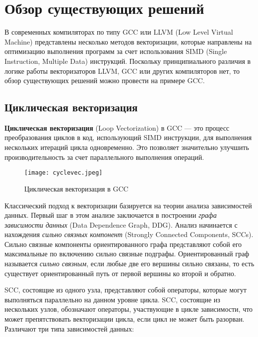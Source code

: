 \section{Обзор существующих решений}
\label{sec:Chapter2} 


В современных компиляторах по типу GCC или LLVM (Low Level Virtual Machine) представлены несколько методов векторизации, которые направлены на оптимизацию выполнения программ за счет использования SIMD (Single Instruction, Multiple Data) инструкций. Поскольку принципиального различия в логике работы векторизаторов LLVM, GCC или других компиляторов нет, то обзор существующих решений можно провести на примере GCC.

\subsection{Циклическая векторизация}

\textbf{Циклическая векторизация} (Loop Vectorization) в GCC — это процесс преобразования циклов в код, использующий SIMD инструкции, для выполнения нескольких итераций цикла одновременно. Это позволяет значительно улучшить производительность за счет параллельного выполнения операций.

\begin{figure}[!htb]
    \centering
    \texttt{[image: cyclevec.jpeg]}
    \caption{Циклическая векторизация в GCC}
\end{figure}

Классический подход к векторизации базируется на теории анализа зависимостей данных. Первый шаг в этом анализе заключается в построении \textit{графа зависимости данных} (Data Dependence Graph, DDG). Анализ начинается с нахождения \textit{сильно связных компонент} (Strongly Connected Components, SCCs). Сильно связные компоненты ориентированного графа представляют собой его максимальные по включению сильно связные подграфы. Ориентированный граф называется \textit{сильно связным}, если любые две его вершины сильно связаны, то есть существует ориентированный путь от первой вершины ко второй и обратно.

SCC, состоящие из одного узла, представляют собой операторы, которые могут выполняться параллельно на данном уровне цикла. SCC, состоящие из нескольких узлов, обозначают операторы, участвующие в цикле зависимости, что может препятствовать векторизации цикла, если цикл не может быть разорван. Различают три типа зависимостей данных:

